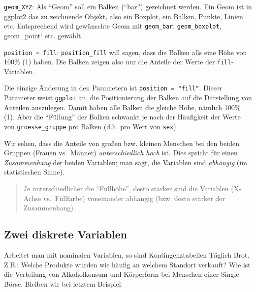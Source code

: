 \documentclass[12pt,ngerman,]{book}
\makeatletter
\newenvironment{Shaded}{\begin{snugshade}}{\end{snugshade}}
\newcommand{\KeywordTok}[1]{\textcolor[rgb]{0.13,0.29,0.53}{\textbf{{#1}}}}
\newcommand{\DataTypeTok}[1]{\textcolor[rgb]{0.13,0.29,0.53}{{#1}}}
\newcommand{\DecValTok}[1]{\textcolor[rgb]{0.00,0.00,0.81}{{#1}}}
\newcommand{\StringTok}[1]{\textcolor[rgb]{0.31,0.60,0.02}{{#1}}}
\newcommand{\NormalTok}[1]{{#1}}
\newenvironment{kframe}{%
\medskip{}
\setlength{\fboxsep}{.8em}
 \def\at@end@of@kframe{}%
 \ifinner\ifhmode%
  \def\at@end@of@kframe{\end{minipage}}%
  \begin{minipage}{\columnwidth}%
 \fi\fi%
 \def\FrameCommand##1{\hskip\@totalleftmargin \hskip-\fboxsep
 \colorbox{shadecolor}{##1}\hskip-\fboxsep
     \hskip-\linewidth \hskip-\@totalleftmargin \hskip\columnwidth}%
 \MakeFramed {\advance\hsize-\width
   \@totalleftmargin\z@ \linewidth\hsize
   \@setminipage}}%
 {\par\unskip\endMakeFramed%
 \at@end@of@kframe}
\renewenvironment{Shaded}{\begin{kframe}}{\end{kframe}}
\makeatother
\begin{document}
\texttt{geom\_XYZ}: Als ``Geom'' soll ein Balken (``bar'') gezeichnet
werden. Ein Geom ist in ggplot2 das zu zeichnende Objekt, also ein
Boxplot, ein Balken, Punkte, Linien etc. Entsprechend wird gewünschte
Geom mit \texttt{geom\_bar}, \texttt{geom\_boxplot}, geom\_point` etc.
gewählt.

\texttt{position\ =\ fill}: \texttt{position\_fill} will sagen, dass die
Balken alls eine Höhe von 100\% (1) haben. Die Balken zeigen also nur
die Anteile der Werte der \texttt{fill}-Variablen.

Die einzige Änderung in den Parametern ist \texttt{position\ =\ "fill"}.
Dieser Parameter weist \texttt{ggplot} an, die Positionierung der Balken
auf die Darstellung von Anteilen auszulegen. Damit haben alle Balken die
gleiche Höhe, nämlich 100\% (1). Aber die ``Füllung'' der Balken
schwankt je nach der Häufigkeit der Werte von \texttt{groesse\_gruppe}
pro Balken (d.h. pro Wert von \texttt{sex}).

Wir sehen, dass die Anteile von großen bzw. kleinen Menschen bei den
beiden Gruppen (Frauen vs.~Männer) \emph{unterschiedlich hoch} ist. Dies
spricht für einen \emph{Zusammenhang} der beiden Variablen; man sagt,
die Variablen sind \emph{abhängig} (im statistischen Sinne).

\begin{quote}
Je unterschiedlicher die ``Füllhöhe'', desto stärker sind die Variablen
(X-Achse vs.~Füllfarbe) voneinander abhängig (bzw. desto stärker der
Zusammenhang).
\end{quote}

\subsection{Zwei diskrete Variablen}\label{zwei-diskrete-variablen}

Arbeitet man mit nominalen Variablen, so sind Kontingenztabellen Täglich
Brot. Z.B.: Welche Produkte wurden wie häufig an welchem Standort
verkauft? Wie ist die Verteilung von Alkoholkonsum und Körperform bei
Menschen einer Single-Börse. Bleiben wir bei letztem Beispiel.

\begin{Shaded}
\end{Shaded}
\end{document}
